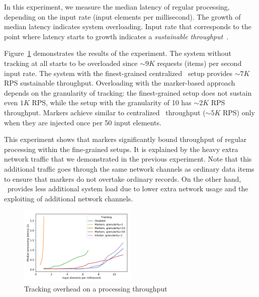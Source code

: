 In this experiment, we measure the median latency of regular processing, depending on the input rate (input elements per millisecond). The growth of median latency indicates system overloading. Input rate that corresponds to the point where latency starts to growth indicates a {\em sustainable throughput}~\cite{karimov2018benchmarking}.

Figure~\ref{throughput_overhead} demonstrates the results of the experiment. The system without tracking at all starts to be overloaded since $\sim 9K$ requests (items) per second input rate. The system with the finest-grained centralized \tracker\ setup provides $\sim 7K$ RPS sustainable throughput. Overloading with the marker-based approach depends on the granularity of tracking: the finest-grained setup does not sustain even $1K$ RPS, while the setup with the granularity of 10 has $\sim 2K$ RPS throughput. Markers achieve similar to centralized \tracker\ throughput ($\sim 5K$ RPS) only when they are injected once per 50 input elements.

This experiment shows that markers significantly bound throughput of regular processing within the fine-grained setups. It is explained by the heavy extra network traffic that we demonstrated in the previous experiment. Note that this additional traffic goes through the same network channels as ordinary data items to ensure that markers do not overtake ordinary records. On the other hand, \tracker\ provides less additional system load due to lower extra network usage and the exploiting of additional network channels.

\begin{figure}[htbp]
  \centering
  \includegraphics[width=0.50\textwidth]{pics/throughput_overhead_50.pdf}
  \caption{Tracking overhead on a processing throughput}
  \label{throughput_overhead}
\end{figure}

